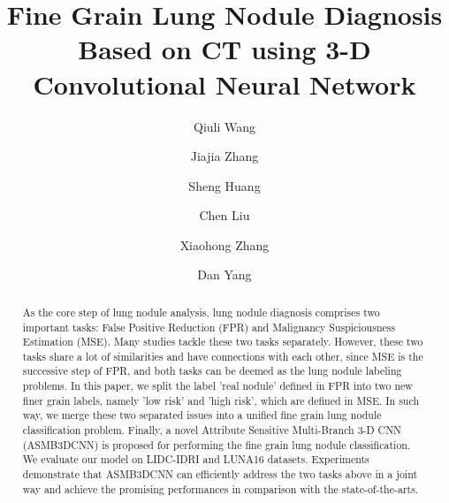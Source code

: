\documentclass[runningheads]{llncs}
\begin{document}
%
\title{Fine Grain Lung Nodule Diagnosis Based on CT using 3-D Convolutional Neural Network}
%
%
\author{Qiuli Wang\and
Jiajia Zhang \and
Sheng Huang \and
Chen Liu\and
Xiaohong Zhang\and
Dan Yang 
}
%
%
%
\maketitle              %
%
\begin{abstract}
As the core step of lung nodule analysis, lung nodule diagnosis comprises two important tasks: False Positive Reduction (FPR) and Malignancy Suspiciousness Estimation (MSE). Many studies tackle these two tasks separately. However, these two tasks share a lot of similarities and have connections with each other, since MSE is the successive step of FPR, and both tasks can be deemed as the lung nodule labeling problems. In this paper, we split the label 'real nodule' defined in FPR into two new finer grain labels, namely 'low risk' and 'high risk', which are defined in MSE. In such way, we merge these two separated issues into a unified fine grain lung nodule classification problem. Finally, a novel Attribute Sensitive Multi-Branch 3-D CNN (ASMB3DCNN) is proposed for performing the fine grain lung nodule classification. We evaluate our model on LIDC-IDRI and LUNA16 datasets. Experiments demonstrate that ASMB3DCNN can efficiently address the two tasks above in a joint way and achieve the promising performances in comparison with the state-of-the-arts.


\end{abstract}
\end{document}
